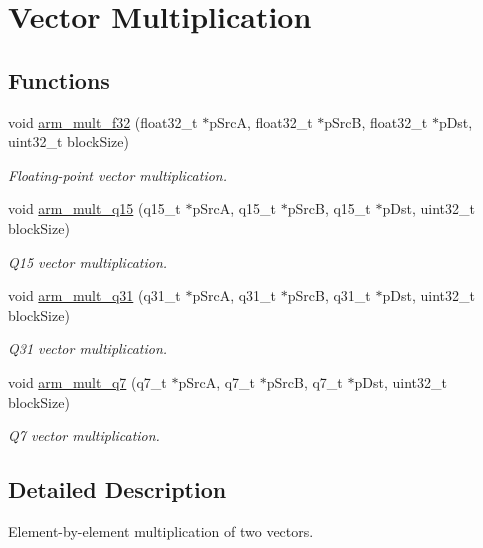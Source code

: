 \hypertarget{group__BasicMult}{}\section{Vector Multiplication}
\label{group__BasicMult}
\subsection*{Functions}
\begin{DoxyCompactItemize}
\item 
void \hyperlink{group__BasicMult_gaca3f0b8227da431ab29225b88888aa32}{arm\+\_\+mult\+\_\+f32} (float32\+\_\+t $\ast$p\+SrcA, float32\+\_\+t $\ast$p\+SrcB, float32\+\_\+t $\ast$p\+Dst, uint32\+\_\+t block\+Size)
\begin{DoxyCompactList}\small\item\em Floating-\/point vector multiplication. \end{DoxyCompactList}\item 
void \hyperlink{group__BasicMult_gafb0778d27ed98a2a6f2ecb7d48cc8c75}{arm\+\_\+mult\+\_\+q15} (q15\+\_\+t $\ast$p\+SrcA, q15\+\_\+t $\ast$p\+SrcB, q15\+\_\+t $\ast$p\+Dst, uint32\+\_\+t block\+Size)
\begin{DoxyCompactList}\small\item\em Q15 vector multiplication. \end{DoxyCompactList}\item 
void \hyperlink{group__BasicMult_ga3528c0f54a0607acc603f0490d3ca6c6}{arm\+\_\+mult\+\_\+q31} (q31\+\_\+t $\ast$p\+SrcA, q31\+\_\+t $\ast$p\+SrcB, q31\+\_\+t $\ast$p\+Dst, uint32\+\_\+t block\+Size)
\begin{DoxyCompactList}\small\item\em Q31 vector multiplication. \end{DoxyCompactList}\item 
void \hyperlink{group__BasicMult_ga16677275ed83ff0878da531e875c27ef}{arm\+\_\+mult\+\_\+q7} (q7\+\_\+t $\ast$p\+SrcA, q7\+\_\+t $\ast$p\+SrcB, q7\+\_\+t $\ast$p\+Dst, uint32\+\_\+t block\+Size)
\begin{DoxyCompactList}\small\item\em Q7 vector multiplication. \end{DoxyCompactList}\end{DoxyCompactItemize}


\subsection{Detailed Description}
Element-\/by-\/element multiplication of two vectors.


